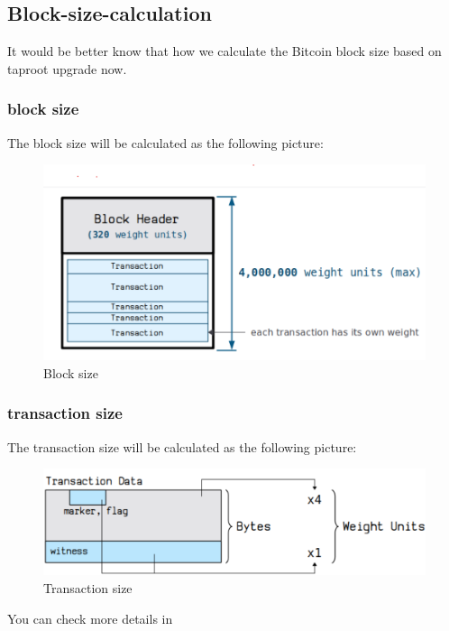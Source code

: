 \subsection{Block-size-calculation}

It would be better know that how we calculate the Bitcoin block size based on taproot upgrade now.

\subsubsection{block size}

The block size will be calculated as the following picture:

\begin{figure}[ht] 
    \centering  
    \includegraphics[width=0.85\columnwidth]{images/block-size.png} 
    \caption{Block size}
    \label{fig:block-size}
\end{figure}

\subsubsection{transaction size}

The transaction size will be calculated as the following picture:

\begin{figure}[ht] 
    \centering  
    \includegraphics[width=0.85\columnwidth]{images/transaction-size.png} 
    \caption{Transaction size}
    \label{fig:transaction-size}
\end{figure}

You can check more details in \cite{website:transaction-size}


